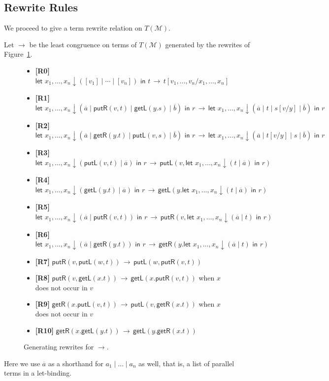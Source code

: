 \documentclass[twoside,11pt,final]{entics}
\newcommand{\getl}{\mathsf{getL}}
\newcommand{\putr}{\mathsf{putR}}
\newcommand{\getr}{\mathsf{getR}}
\newcommand{\putl}{\mathsf{putL}}
\newcommand{\asn}{\downarrow}
\newcommand{\seq}{,\!\ldots\!,}
\begin{document}
\subsection{Rewrite Rules}
  We proceed to give a term rewrite relation on $T(\mathcal{M})$.
\begin{definition}\label{def:rewrites}
  Let $\to$ be the least congruence on terms of $T(\mathcal{M})$ generated by the rewrites of Figure~\ref{fig:rewrites}. 

  \begin{figure}\begin{mdframed}
      \begin{itemize}
      \item[] \textbf{[R0]} $\textsf{let } x_1 \seq x_n \asn ([v_1] \mid \cdots \mid [v_n]) \textsf{ in } t \,\to\, t[v_1 \seq v_n/x_1 \seq x_n]$
      \item[] \textbf{[R1]} $\textsf{let } x_1 \seq x_n \asn (\overline{a} \mid \putr(v,t) \mid \getl(y.s) \mid \overline{b}) \textsf{ in } r \,\to\, \textsf{let } x_1 \seq x_n \asn (\overline{a} \mid t \mid s[v/y] \mid \overline{b}) \textsf{ in } r$
      \item[] \textbf{[R2]} $\textsf{let } x_1 \seq x_n \asn (\overline{a} \mid \getr(y.t) \mid \putl(v,s) \mid \overline{b}) \textsf{ in } r \,\to\, \textsf{let } x_1 \seq x_n \asn (\overline{a} \mid t[v/y] \mid s \mid \overline{b}) \textsf{ in } r$
      \item[] \textbf{[R3]} $\textsf{let } x_1 \seq x_n \asn (\putl(v,t) \mid \overline{a}) \textsf{ in } r \,\to\, \putl(v,\textsf{let } x_1 \seq x_n \asn (t \mid \overline{a}) \textsf{ in } r)$
      \item[] \textbf{[R4]} $\textsf{let } x_1 \seq x_n \asn (\getl(y.t) \mid \overline{a}) \textsf{ in } r \,\to\, \getl(y.\textsf{let } x_1 \seq x_n \asn (t \mid \overline{a}) \textsf{ in } r)$
      \item[] \textbf{[R5]} $\textsf{let } x_1 \seq x_n \asn (\overline{a} \mid \putr(v,t)) \textsf{ in } r \,\to\, \putr(v,\textsf{let } x_1 \seq x_n \asn (\overline{a} \mid t) \textsf{ in } r)$
      \item[] \textbf{[R6]} $\textsf{let } x_1 \seq x_n \asn (\overline{a} \mid \getr(y.t)) \textsf{ in } r \,\to\, \getr(y.\textsf{let } x_1 \seq x_n \asn (\overline{a} \mid t) \textsf{ in } r)$
      \item[] \textbf{[R7]} $\putr(v,\putl(w,t)) \,\to\, \putl(w,\putr(v,t))$
      \item[] \textbf{[R8]} $\putr(v,\getl(x.t)) \,\to\, \getl(x.\putr(v,t))$ when $x$ does not occur in $v$
      \item[] \textbf{[R9]} $\getr(x.\putl(v,t)) \,\to\, \putl(v,\getr(x.t))$ when $x$ does not occur in $v$
      \item[] \textbf{[R10]} $\getr(x.\getl(y.t)) \,\to\, \getl(y.\getr(x.t))$
      \end{itemize}
  \end{mdframed}\caption{Generating rewrites for $\to$.}\label{fig:rewrites}\end{figure}
\end{definition}
\noindent
Here we use $\overline{a}$ as a shorthand for $a_1 \mid \dots \mid a_n$ as well, that is, a list of parallel terms in a let-binding.
\end{document}
